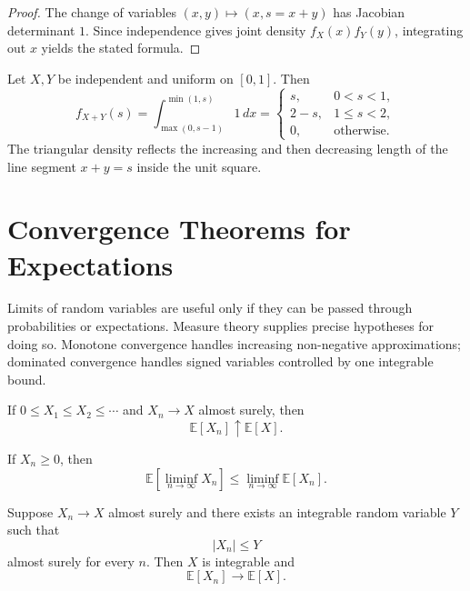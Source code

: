 \begin{proof}
The change of variables $(x,y)\mapsto(x,s=x+y)$ has Jacobian determinant $1$. Since independence gives joint density $f_X(x)f_Y(y)$, integrating out $x$ yields the stated formula.
\end{proof}

\begin{example}
Let $X,Y$ be independent and uniform on $[0,1]$. Then
\[
    f_{X+Y}(s)
    =\int_{\max(0,s-1)}^{\min(1,s)}1\,dx
    =
    \begin{cases}
    s,&0<s<1,\\
    2-s,&1\leq s<2,\\
    0,&\text{otherwise}.
    \end{cases}
\]
The triangular density reflects the increasing and then decreasing length of the line segment $x+y=s$ inside the unit square.
\end{example}

\section{Convergence Theorems for Expectations}

Limits of random variables are useful only if they can be passed through probabilities or expectations. Measure theory supplies precise hypotheses for doing so. Monotone convergence handles increasing non-negative approximations; dominated convergence handles signed variables controlled by one integrable bound.

\begin{theorem}
If $0\leq X_1\leq X_2\leq\cdots$ and $X_n\to X$ almost surely, then
\[
    \mathbb{E}[X_n]\uparrow\mathbb{E}[X].
\]
\end{theorem}

\begin{theorem}
If $X_n\geq0$, then
\[
    \mathbb{E}\left[\liminf_{n\to\infty}X_n\right]
    \leq
    \liminf_{n\to\infty}\mathbb{E}[X_n].
\]
\end{theorem}

\begin{theorem}
Suppose $X_n\to X$ almost surely and there exists an integrable random variable $Y$ such that
\[
    |X_n|\leq Y
\]
almost surely for every $n$. Then $X$ is integrable and
\[
    \mathbb{E}[X_n]\to\mathbb{E}[X].
\]
\end{theorem}

